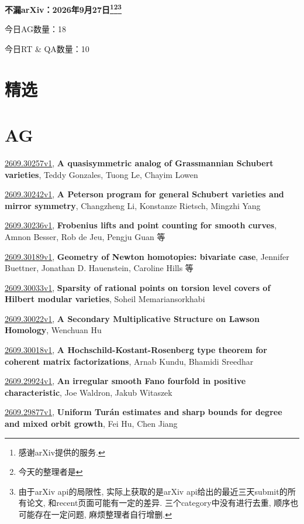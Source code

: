 \documentclass[9pt, a4paper]{article}
\theoremstyle{plain}
\theoremstyle{definition}
\theoremstyle{remark}
\newcommand{\arxiv}[3]{\href{https://arxiv.org/abs/#1}{#1}, \textbf{\textcolor{arxivblue}{#2}}, #3}
\newcommand{\AGnumber}{18}
\newcommand{\RTQAnumber}{10}
\newcommand{\NewestDate}{2026年9月27日}
\newcommand{\todayarXiver}{} %
\begin{document}
\begin{center}
    \Huge\textbf{不漏arXiv：\NewestDate\footnote{感谢arXiv提供的服务.}\footnote{今天的整理者是\todayarXiver}\footnote{由于arXiv api的局限性, 实际上获取的是arXiv api给出的最近三天submit的所有论文, 和recent页面可能有一定的差异. 三个category中没有进行去重, 顺序也可能存在一定问题, 麻烦整理者自行增删.}} \\
\end{center}

\setcounter{section}{-1}

\begin{center}
    今日AG数量：\AGnumber
    
    今日RT \& QA数量：\RTQAnumber
    
\end{center}


\section{精选}


\section{AG}
\arxiv{2609.30257v1}{A quasisymmetric analog of Grassmannian Schubert varieties}{Teddy Gonzales, Tuong Le, Chayim Lowen}

\arxiv{2609.30242v1}{A Peterson program for general Schubert varieties and mirror symmetry}{Changzheng Li, Konstanze Rietsch, Mingzhi Yang}

\arxiv{2609.30236v1}{Frobenius lifts and point counting for smooth curves}{Amnon Besser, Rob de Jeu, Pengju Guan 等}

\arxiv{2609.30189v1}{Geometry of Newton homotopies: bivariate case}{Jennifer Buettner, Jonathan D. Hauenstein, Caroline Hills 等}

\arxiv{2609.30033v1}{Sparsity of rational points on torsion level covers of Hilbert modular varieties}{Soheil Memariansorkhabi}

\arxiv{2609.30022v1}{A Secondary Multiplicative Structure on Lawson Homology}{Wenchuan Hu}

\arxiv{2609.30018v1}{A Hochschild-Kostant-Rosenberg type theorem for coherent matrix factorizations}{Arnab Kundu, Bhamidi Sreedhar}

\arxiv{2609.29924v1}{An irregular smooth Fano fourfold in positive characteristic}{Joe Waldron, Jakub Witaszek}

\arxiv{2609.29877v1}{Uniform Turán estimates and sharp bounds for degree and mixed orbit growth}{Fei Hu, Chen Jiang}
\end{document}

